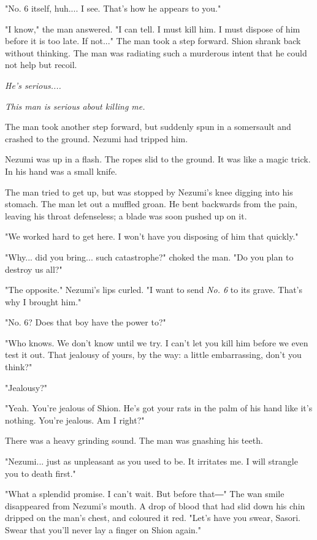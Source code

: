 "No. 6 itself, huh.... I see. That's how he appears to you."

"I know," the man answered. "I can tell. I must kill him. I must dispose
of him before it is too late. If not..." The man took a step forward.
Shion shrank back without thinking. The man was radiating such a
murderous intent that he could not help but recoil.

\emph{He's serious....}

\emph{This man is serious about killing me.}

The man took another step forward, but suddenly spun in a somersault and
crashed to the ground. Nezumi had tripped him.

Nezumi was up in a flash. The ropes slid to the ground. It was like a
magic trick. In his hand was a small knife.

The man tried to get up, but was stopped by Nezumi's knee digging into
his stomach. The man let out a muffled groan. He bent backwards from the
pain, leaving his throat defenseless; a blade was soon pushed up on it.

"We worked hard to get here. I won't have you disposing of him that
quickly."

"Why... did you bring... such catastrophe?" choked the man. "Do you plan
to destroy us all?"

"The opposite." Nezumi's lips curled. "I want to send \emph{No. 6} to its
grave. That's why I brought him."

"No. 6? Does that boy have the power to?"

"Who knows. We don't know until we try. I can't let you kill him before
we even test it out. That jealousy of yours, by the way: a little
embarrassing, don't you think?"

"Jealousy?"

"Yeah. You're jealous of Shion. He's got your rats in the palm of his
hand like it's nothing. You're jealous. Am I right?"

There was a heavy grinding sound. The man was gnashing his teeth.

"Nezumi... just as unpleasant as you used to be. It irritates me. I will
strangle you to death first."

"What a splendid promise. I can't wait. But before that―" The wan smile
disappeared from Nezumi's mouth. A drop of blood that had slid down his
chin dripped on the man's chest, and coloured it red. "Let's have you
swear, Sasori. Swear that you'll never lay a finger on Shion again."

